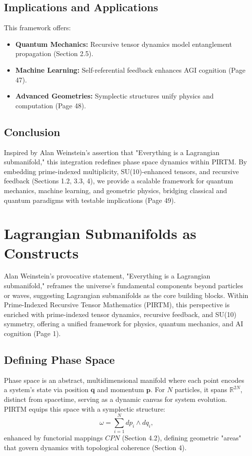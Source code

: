 \documentclass{article}
\theoremstyle{plain}
\begin{document}
\subsection{Implications and Applications}
This framework offers:
\begin{itemize}
    \item \textbf{Quantum Mechanics:} Recursive tensor dynamics model entanglement propagation (Section 2.5).
    \item \textbf{Machine Learning:} Self-referential feedback enhances AGI cognition (Page 47).
    \item \textbf{Advanced Geometries:} Symplectic structures unify physics and computation (Page 48).
\end{itemize}

\subsection{Conclusion}
Inspired by Alan Weinstein’s assertion that "Everything is a Lagrangian submanifold," this integration redefines phase space dynamics within PIRTM. By embedding prime-indexed multiplicity, SU(10)-enhanced tensors, and recursive feedback (Sections 1.2, 3.3, 4), we provide a scalable framework for quantum mechanics, machine learning, and geometric physics, bridging classical and quantum paradigms with testable implications (Page 49).

\section{Lagrangian Submanifolds as Constructs}

Alan Weinstein’s provocative statement, "Everything is a Lagrangian submanifold," reframes the universe’s fundamental components beyond particles or waves, suggesting Lagrangian submanifolds as the core building blocks. Within Prime-Indexed Recursive Tensor Mathematics (PIRTM), this perspective is enriched with prime-indexed tensor dynamics, recursive feedback, and SU(10) symmetry, offering a unified framework for physics, quantum mechanics, and AI cognition (Page 1).

\subsection{Defining Phase Space}

Phase space is an abstract, multidimensional manifold where each point encodes a system’s state via position \( \bm{q} \) and momentum \( \bm{p} \). For \( N \) particles, it spans \( \mathbb{R}^{2N} \), distinct from spacetime, serving as a dynamic canvas for system evolution. PIRTM equips this space with a symplectic structure:
\begin{equation}
\omega = \sum_{i=1}^N dp_i \wedge dq_i,
\end{equation}
enhanced by functorial mappings \( CPN \) (Section 4.2), defining geometric "areas" that govern dynamics with topological coherence (Section 4).
\end{document}
